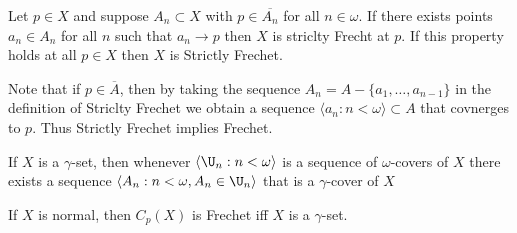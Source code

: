 \documentclass{article}
\begin{document}
\begin{defn}
    Let \(p \in X\) and suppose \(A_n \subset X\) with \(p \in \overline{A_n}\) for all \(n \in \omega\). If there exists points \(a_n \in A_n\) for all \(n\) such that \(a_n \to p\) then \(X\) is striclty Frecht at \(p\). If this property holds at all \(p \in X\) then \(X\) is Strictly Frechet. 
\end{defn}
Note that if \(p \in \overline{A}\), then by taking the sequence \(A_n = A - \{a_1, \dots, a_{n-1}\}\) in the definition of Striclty Frechet we obtain a sequence \(\langle a_n : n < \omega\rangle \subset A\) that covnerges to \(p\). Thus Strictly Frechet implies Frechet.
\begin{lem}
\label{lem: gamma set}
    If \(X\) is a \(\gamma\)-set, then whenever \(\langle\U_n:n < \omega\rangle\) is a sequence of \(\omega\)-covers of \(X\) there exists a sequence \(\langle A_n : n < \omega, A_n \in \U_n\rangle\) that is a \(\gamma\)-cover of \(X\)
\end{lem}
\begin{prop}
    If \(X\) is normal, then \(C_p(X)\) is Frechet iff \(X\) is a \(\gamma\)-set.
\end{prop}
\end{document}
